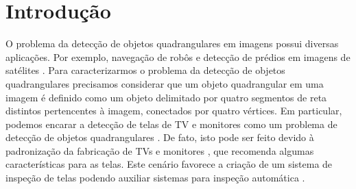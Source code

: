 \section{Introdução}

O problema da detecção de objetos quadrangulares em imagens \cite{quadquadrinhos ,objquadrangular00} possui diversas aplicações. Por exemplo, navegação de robôs \cite{navegrobo,navegrobo00} e detecção de prédios em imagens de satélites \cite{prediosatelite,prediosatelite00,prediosatelite01}. %
 Para caracterizarmos o problema da detecção de objetos quadrangulares precisamos considerar que um objeto quadrangular \cite{quadquadrinhos} em uma imagem é definido como um objeto delimitado por quatro segmentos de reta distintos pertencentes à imagem, conectados por quatro vértices. Em particular, podemos encarar a detecção de telas de TV e monitores como um problema de detecção de objetos quadrangulares \cite{inspect}. De fato, isto pode ser feito devido à padronização da fabricação de TVs e monitores \cite{DVB}, que recomenda algumas características para as telas. Este cenário favorece a criação de um sistema de inspeção de telas podendo auxiliar sistemas para inspeção automática \cite{inspect}.



